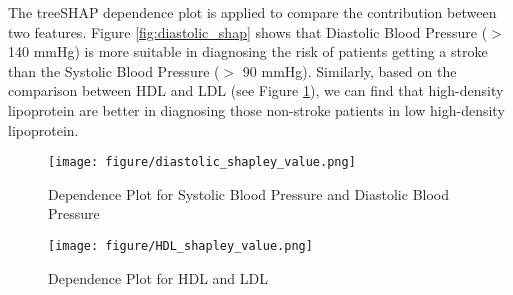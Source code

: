 \documentclass{article}
\begin{document}
 The treeSHAP dependence plot is applied to compare the contribution between two features. 
 Figure \ref{fig:diastolic_shap} shows that Diastolic Blood Pressure ($>$ 140 mmHg) is more suitable in diagnosing the risk of patients getting a stroke than the Systolic Blood Pressure ($>$ 90 mmHg). 
 Similarly, based on the comparison between HDL and LDL (see Figure \ref{fig:HDL_shap}), we can find that high-density lipoprotein are better in diagnosing those non-stroke patients in low high-density lipoprotein.
\begin{comment}
Comparing to Systolic Blood Pressure, Diastolic Blood Pressure might be better in diagnosing the risk of patients getting a stroke. Based on the dependence plot in Figure \ref{fig:diastolic_shap}, we can see that diastolic blood pressure contributes more a lot to diagnosing patients with high diastolic blood pressure($>$ 140 mmHg) comparing to patients with high systolic blood pressure($>$ 90 mmHg). Similarly, based on the comparison between HDL and LDL (see Figure \ref{fig:HDL_shap}), we can find that high-density lipoprotein are better in diagnosing those non-stroke patients in low high-density lipoprotein.
\end{comment}
\begin{figure}[H]
\centering
\begin{minipage}[t]{0.48\textwidth}
\centering
\texttt{[image: figure/diastolic\_shapley\_value.png]}
\caption{Dependence Plot for Systolic Blood Pressure and Diastolic Blood Pressure}
\label{fig:diastolic_shap}
\end{minipage}
\begin{minipage}[t]{0.48\textwidth}
\centering
\texttt{[image: figure/HDL\_shapley\_value.png]}
\caption{Dependence Plot for HDL and LDL}
\label{fig:HDL_shap}
\end{minipage}
\end{figure}
\end{document}
